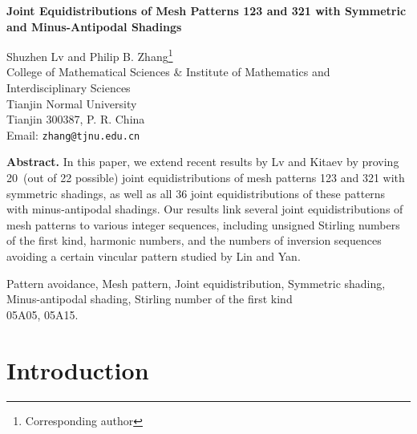 \documentclass[12pt]{article}
\begin{document}
\begin{center}
{\large \bf Joint Equidistributions of Mesh Patterns 123 and 321 with Symmetric and Minus-Antipodal Shadings}
\end{center}

\begin{center}
Shuzhen Lv  and  Philip B. Zhang\footnote[1]{Corresponding author}
\\[6pt]

College of Mathematical Sciences
 \& Institute of Mathematics and Interdisciplinary Sciences
\\
Tianjin Normal University \\ Tianjin  300387, P. R. China\\[6pt]
Email:
      {\tt zhang@tjnu.edu.cn}
\end{center}

\noindent\textbf{Abstract.}
In this paper, we extend recent results by Lv and Kitaev by proving 20~(out of 22 possible) joint equidistributions of mesh patterns 123 and 321 with symmetric shadings, as well as all 36 joint equidistributions of these patterns with minus-antipodal shadings. Our results link several joint equidistributions of mesh patterns to various integer sequences, including unsigned Stirling numbers of the first kind, harmonic numbers, and the numbers of inversion sequences avoiding a certain vincular pattern studied by Lin and Yan. 

Pattern avoidance,
Mesh pattern, Joint equidistribution,  Symmetric shading, Minus-antipodal shading, Stirling number of the first kind\\

 05A05, 05A15.\\



\section{Introduction}\label{intro}
\end{document}

